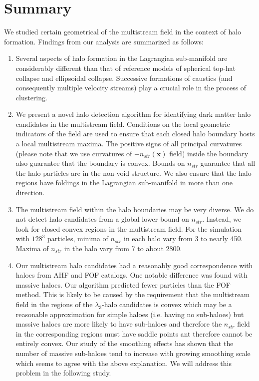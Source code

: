\section{Summary}
\label{sec:summary}

We studied certain geometrical of the multistream field in the context of halo formation. Findings from our analysis are summarized as follows: 

\begin{enumerate}

\item Several aspects of halo formation in the Lagrangian sub-manifold are considerably different than that of reference models of spherical top-hat collapse and ellipsoidal collapse. Successive formations of caustics (and consequently multiple velocity streams) play a crucial role in the process of clustering.

\item We present a novel halo detection algorithm for identifying dark matter halo candidates in the multistream field. Conditions on the local geometric indicators of the field are used to ensure that each closed halo boundary hosts a local multistream maxima. The 
positive signs of all principal curvatures  (please note that we use curvatures of $-n_{str}(\mathbf{x})$ field) inside the boundary also guarantee that the boundary is convex. 
Bounds on $n_{str}$  guarantee that all the halo particles are in the non-void structure. We also ensure that the halo regions have foldings in the Lagrangian sub-manifold in more than one direction.  

\item The multistream field within the halo boundaries may be very diverse. We do not detect halo candidates from a global lower bound on $n_{str}$. Instead, we look for closed convex regions in the multistream field. For the simulation with $128^3$ particles, minima of $n_{str}$ in each halo vary from 3 to nearly 450. Maxima of $n_{str}$ in the halo vary from 7 to about 2800. 

\item Our multistream halo candidates had a reasonably good correspondence with haloes from AHF and FOF catalogs. One notable difference was found with massive haloes. Our algorithm predicted fewer particles than the FOF method. This is likely to be caused
by the requirement that the multistream field in the regions of the $\lambda_3$-halo candidates is convex  which may be a reasonable approximation  for simple haloes (i.e. having no sub-haloes) but massive haloes are more likely to have sub-haloes and therefore the $n_{str}$ field in the corresponding regions must have saddle points ant therefore cannot be entirely convex. Our study of the smoothing effects  has shown that the number of massive sub-haloes tend to increase with growing smoothing scale which seems to agree with the above explanation. We will address this problem in the following study.
  


\end{enumerate}
